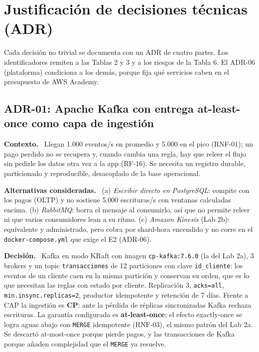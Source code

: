 \documentclass[12pt,letterpaper]{article}
\newcommand{\code}[1]{{\small\texttt{#1}}}
\newcommand{\adrpart}[1]{\textbf{#1.}~}
\begin{document}
\begin{landscape}
\begin{center}
\end{center}
\end{landscape}
\restoregeometry

\section{Justificación de decisiones técnicas (ADR)}

Cada decisión no trivial se documenta con un ADR de cuatro partes. Los identificadores remiten a las Tablas 2 y 3 y a los riesgos de la Tabla 6. El ADR-06 (plataforma) condiciona a los demás, porque fija qué servicios caben en el presupuesto de AWS Academy.

\subsection*{ADR-01: Apache Kafka con entrega at-least-once como capa de ingestión}

\adrpart{Contexto} Llegan 1.000 eventos/s en promedio y 5.000 en el pico (RNF-01); un pago perdido no se recupera y, cuando cambia una regla, hay que releer el flujo sin pedirle los datos otra vez a la app (RF-16). Se necesita un registro durable, particionado y reproducible, desacoplado de la base operacional.

\adrpart{Alternativas consideradas} (a) \emph{Escribir directo en PostgreSQL}: compite con los pagos (OLTP) y no sostiene 5.000 escrituras/s con ventanas calculadas encima. (b) \emph{RabbitMQ}: borra el mensaje al consumirlo, así que no permite releer ni que varios consumidores lean a su ritmo. (c) \emph{Amazon Kinesis} (Lab 2b): equivalente y administrado, pero cobra por shard-hora encendido y no corre en el \code{docker-compose.yml} que exige el E2 (ADR-06).

\adrpart{Decisión} Kafka en modo KRaft con imagen \code{cp-kafka:7.6.0} (la del Lab 2a), 3 brokers y un topic \code{transacciones} de 12 particiones con clave \code{id\_cliente}: los eventos de un cliente caen en la misma partición y conservan su orden, que es lo que necesitan las reglas con estado por cliente. Replicación 3, \code{acks=all}, \code{min.insync.replicas=2}, productor idempotente y retención de 7 días. Frente a CAP la ingestión es \textbf{CP}: ante la pérdida de réplicas sincronizadas Kafka rechaza escrituras. La garantía configurada es \textbf{at-least-once}; el efecto exactly-once se logra aguas abajo con \code{MERGE} idempotente (RNF-03), el mismo patrón del Lab 2a. Se descartó at-most-once porque pierde pagos, y las transacciones de Kafka porque añaden complejidad que el \code{MERGE} ya resuelve.
\end{document}
